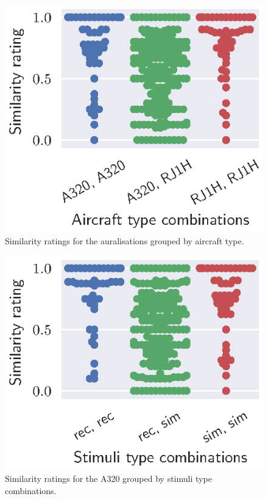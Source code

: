\begin{figure}[H]
  \centering
  \includegraphics[]{../figures/manual/auralisation-paper/figure2_ratings_simulations}
  \caption{Similarity ratings for the auralisations grouped by aircraft type.}
  \label{fig:ratings_simulations}
\end{figure}

\begin{figure}[H]
  \centering
  \includegraphics[]{../figures/manual/auralisation-paper/figure3_ratings_A320}
  \caption{Similarity ratings for the A320 grouped by stimuli type combinations.}
  \label{fig:ratings_A320}
\end{figure}

